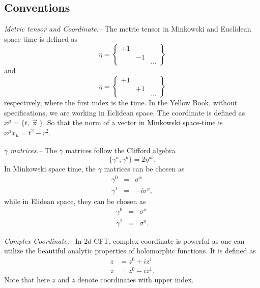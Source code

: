 \documentclass[submission, PhysLectNotes]{SciPost}
\begin{document}
\subsection{Conventions}
{\it Metric tensor and Coordinate.--}  The metric tensor in Minkowski and Euclidean space-time is defined as
\begin{equation}
    \eta = \begin{Bmatrix}
        +1 &   &\\
           & -1& \\
           &   & ...
    \end{Bmatrix}
\end{equation}
and
\begin{equation}
    \eta = \begin{Bmatrix}
        +1 &   &\\
           & +1& \\
           &   & ...
    \end{Bmatrix}
\end{equation}
respectively, where the first index is the time. In the Yellow Book, without specifications, we are working in Eclidean space. The coordinate is defined as $x^\mu = \{t, \mathop{x}\limits^\rightarrow\}$. So that the norm of a vector in Minkowski space-time is $x^\mu x_\mu = t^2 - r^2$.

{\it $\gamma$ matrices.--}   The $\gamma$ matrices follow the Clifford algebra
\begin{equation}
    \{\gamma^a,\gamma^b\} = 2\eta^{ab}.
\end{equation}
In Minkowski space time, the $\gamma$ matrices can be chosen as
\begin{eqnarray}
    \gamma^0 &=& \sigma^x \nonumber \\
    \gamma^1 &=&  -i\sigma^y,
\end{eqnarray}
while in Elidean space, they can be chosen as
\begin{eqnarray}
    \gamma^0 &=& \sigma^x \nonumber \\
    \gamma^1 &=& \sigma^y.
\end{eqnarray}

{\it Complex Coordinate.--}  In $2d$ CFT, complex coordinate is powerful as one can utilize the beautiful analytic properties of holomorphic functions. It is defined as 
\begin{equation}
\begin{aligned}
z &= z^0 + i z^1 \\
\bar{z} &= z^0 - i z^1.
\end{aligned}
\end{equation}  
Note that here $z$ and $\bar{z}$ denote coordinates with upper index.
\end{document}
